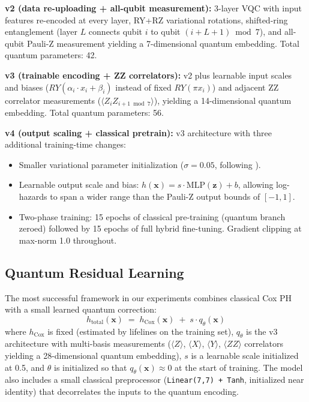 \documentclass[12pt, letterpaper]{article}
\begin{document}
\textbf{v2 (data re-uploading + all-qubit measurement):} 3-layer VQC with input features re-encoded at every layer, RY+RZ variational rotations, shifted-ring entanglement (layer $L$ connects qubit $i$ to qubit $(i+L+1) \bmod 7$), and all-qubit Pauli-Z measurement yielding a 7-dimensional quantum embedding. Total quantum parameters: 42.

\textbf{v3 (trainable encoding + ZZ correlators):} v2 plus learnable input scales and biases ($RY(\alpha_i \cdot x_i + \beta_i)$ instead of fixed $RY(\pi x_i)$) and adjacent ZZ correlator measurements ($\langle Z_i Z_{i+1 \bmod 7} \rangle$), yielding a 14-dimensional quantum embedding. Total quantum parameters: 56.

\textbf{v4 (output scaling + classical pretrain):} v3 architecture with three additional training-time changes:
\begin{itemize}
    \item Smaller variational parameter initialization ($\sigma = 0.05$, following \citep{grant2019}).
    \item Learnable output scale and bias: $h(\mathbf{x}) = s \cdot \text{MLP}(\mathbf{z}) + b$, allowing log-hazards to span a wider range than the Pauli-Z output bounds of $[-1, 1]$.
    \item Two-phase training: 15 epochs of classical pre-training (quantum branch zeroed) followed by 15 epochs of full hybrid fine-tuning. Gradient clipping at max-norm 1.0 throughout.
\end{itemize}

\subsection{Quantum Residual Learning}

The most successful framework in our experiments combines classical Cox PH with a small learned quantum correction:
\[
h_{\text{total}}(\mathbf{x}) \;=\; h_{\text{Cox}}(\mathbf{x}) \;+\; s \cdot q_\theta(\mathbf{x})
\]
where $h_{\text{Cox}}$ is fixed (estimated by lifelines on the training set), $q_\theta$ is the v3 architecture with multi-basis measurements ($\langle Z \rangle$, $\langle X \rangle$, $\langle Y \rangle$, $\langle ZZ \rangle$ correlators yielding a 28-dimensional quantum embedding), $s$ is a learnable scale initialized at 0.5, and $\theta$ is initialized so that $q_\theta(\mathbf{x}) \approx 0$ at the start of training. The model also includes a small classical preprocessor (\texttt{Linear(7,7) + Tanh}, initialized near identity) that decorrelates the inputs to the quantum encoding.
\end{document}
